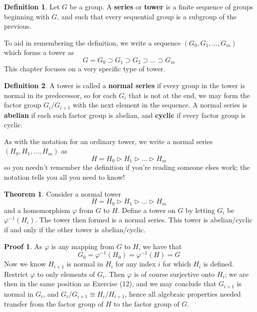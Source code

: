 \documentclass[12pt]{amsbook}
\theoremstyle{definition}
\newtheorem{theorem}{Theorem}[chapter]
\newtheorem{definition}{Definition}
\newtheorem*{prf}{Proof}
\begin{document}
\begin{definition}
    Let $G$ be a group. A {\bf series}  or {\bf tower}  is a finite sequence of groups beginning with $G$, and such that every sequential group is a subgroup of the previous.
\end{definition}

To aid in remembering the definition, we write a sequence $(G_0, G_1, \dots, G_m)$ which forms a tower as
%
\[ G = G_0 \supset G_1 \supset G_2 \supset \dots \supset G_m \]
%
This chapter focuses on a very specific type of tower.

\begin{definition}
    A tower is called a {\bf normal series} if every group in the tower is normal in its predecessor, so for each $G_i$ that is not at the end, we may form the factor group $G_i/G_{i+1}$ with the next element in the sequence. A normal series is {\bf abelian} if each such factor group is abelian, and {\bf cyclic}  if every factor group is cyclic.
\end{definition}

As with the notation for an ordinary tower, we write a normal series $(H_0, H_1, \dots, H_m)$ as
%
\[ H = H_0 \rhd H_1 \rhd \dots \rhd H_m \]
%
so you needn't remember the definition if you're reading someone elses work; the notation tells you all you need to know!

\begin{theorem}
    Consider a normal tower
    \[ H = H_0 \rhd H_1 \rhd \dots \rhd H_m \]
    and a homomorphism $\varphi$ from $G$ to $H$. Define a tower on $G$ by letting $G_i$ be $\varphi^{-1}(H_i)$. The tower then formed is a normal series. This tower is abelian/cyclic if and only if the other tower is abelian/cyclic.
\end{theorem}
\begin{prf}
    As $\varphi$ is any mapping from $G$ to $H$, we have that
    \[ G_0 = \varphi^{-1}(H_0) = \varphi^{-1}(H) = G \]
    Now we know $H_{i+1}$ is normal in $H_i$ for any index $i$ for which $H_i$ is defined. Restrict $\varphi$ to only elements of $G_i$. Then $\varphi$ is of course surjective onto $H_i$; we are then in the same position as Exercise (12), and we may conclude that $G_{i+1}$ is normal in $G_i$, and $G_i/G_{i+1} \cong H_i/H_{i+1}$, hence all algebraic properties needed transfer from the factor group of $H$ to the factor group of $G$.
\end{prf}
\end{document}
